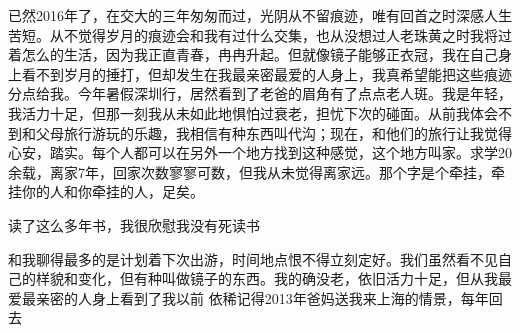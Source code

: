\begin{thanks}

已然2016年了，在交大的三年匆匆而过，光阴从不留痕迹，唯有回首之时深感人生苦短。从不觉得岁月的痕迹会和我有过什么交集，也从没想过人老珠黄之时我将过着怎么的生活，因为我正直青春，冉冉升起。但就像镜子能够正衣冠，我在自己身上看不到岁月的捶打，但却发生在我最亲密最爱的人身上，我真希望能把这些痕迹分点给我。今年暑假深圳行，居然看到了老爸的眉角有了点点老人斑。我是年轻，我活力十足，但那一刻我从未如此地惧怕过衰老，担忧下次的碰面。从前我体会不到和父母旅行游玩的乐趣，我相信有种东西叫代沟；现在，和他们的旅行让我觉得心安，踏实。每个人都可以在另外一个地方找到这种感觉，这个地方叫家。求学20余载，离家7年，回家次数寥寥可数，但我从未觉得离家远。那个字是个牵挂，牵挂你的人和你牵挂的人，足矣。

读了这么多年书，我很欣慰我没有死读书

和我聊得最多的是计划着下次出游，时间地点恨不得立刻定好。我们虽然看不见自己的样貌和变化，但有种叫做镜子的东西。我的确没老，依旧活力十足，但从我最爱最亲密的人身上看到了我以前
依稀记得2013年爸妈送我来上海的情景，每年回去

\end{thanks}
